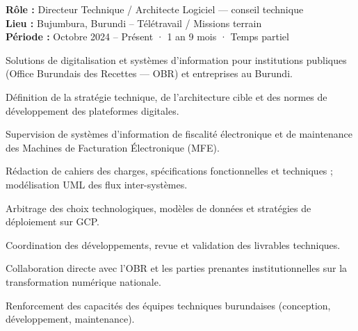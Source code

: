 \newpage
{}

\cvgroupreset

\begin{cvgroup}

\begin{cvmetadata}
\textbf{Rôle :} Directeur Technique / Architecte Logiciel — conseil technique \\
\textbf{Lieu :} Bujumbura, Burundi – Télétravail / Missions terrain \\
\textbf{Période :} Octobre 2024 – Présent · 1 an 9 mois · Temps partiel
\end{cvmetadata}

\begin{cvprojectsummary}
Solutions de digitalisation et systèmes d'information pour institutions publiques (Office Burundais des Recettes — OBR) et entreprises au Burundi.
\end{cvprojectsummary}


\begin{cvdetailmissions}
  \item {Définition de la stratégie technique, de l'architecture cible et des normes de développement des plateformes digitales.}
  \item {Supervision de systèmes d'information de fiscalité électronique et de maintenance des Machines de Facturation Électronique (MFE).}
  \item {Rédaction de cahiers des charges, spécifications fonctionnelles et techniques ; modélisation UML des flux inter-systèmes.}
  \item {Arbitrage des choix technologiques, modèles de données et stratégies de déploiement sur GCP.}
  \item {Coordination des développements, revue et validation des livrables techniques.}
  \item {Collaboration directe avec l'OBR et les parties prenantes institutionnelles sur la transformation numérique nationale.}
  \item {Renforcement des capacités des équipes techniques burundaises (conception, développement, maintenance).}
\end{cvdetailmissions}

\end{cvgroup}

